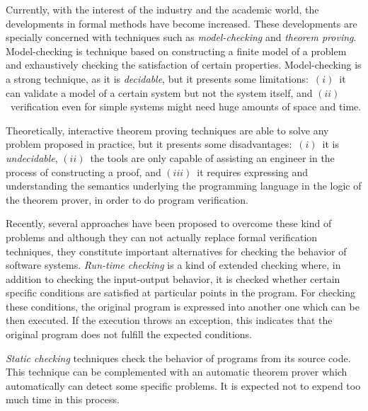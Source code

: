 \documentclass[a4paper]{llncs}
\begin{document}
Currently, with the interest of the industry and the academic world,
the developments in formal methods have become
increased. These developments are specially concerned with techniques
such as
\textit{model-checking} and \textit{theorem proving}.
Model-checking is technique based on constructing a finite model of a
problem and exhaustively checking the satisfaction of certain
properties. Model-checking is
a strong technique, as it is \emph{decidable}, but it presents some
limitations$:$ $(i)$~it can validate a
model of a certain system but not the system itself, and
$(ii)$~verification even for simple systems might need huge amounts
of space and time. 

Theoretically, interactive theorem proving techniques are able to
solve any problem proposed in practice, but it presents some
disadvantages$:$ $(i)$~it is \emph{undecidable}, $(ii)$~the tools are
only capable of assisting an engineer in the process of constructing a
proof, and $(iii)$~it requires expressing and understanding the
semantics underlying the
programming language in the logic of the theorem prover, in order to
do program verification. 

Recently, several approaches have been
proposed to overcome these kind of problems and although they can not
actually replace formal verification techniques, they constitute
important alternatives for checking the behavior of software
systems. \emph{Run-time
checking} is a kind of extended checking where, in addition to checking
the input-output behavior, it is checked whether certain specific
conditions are
satisfied at particular points in the program. For checking these
conditions, the original program is expressed into another
one
which can be then executed. If the execution throws an exception,
this indicates that the original program does not fulfill the
expected conditions.

\emph{Static checking} techniques check the behavior of programs
from its source code. This technique can be complemented with
an automatic theorem prover which automatically can detect
some specific problems. It is expected not to expend too much time in
this process.
\end{document}
